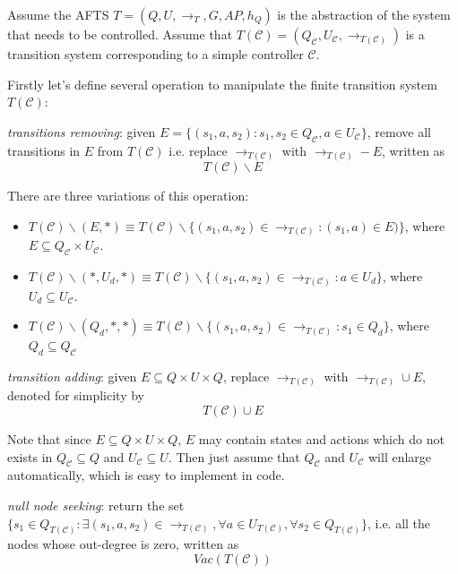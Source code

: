 Assume the AFTS $ T = (Q,U,\rightarrow_T, G, AP, h_Q) $ is the abstraction of the system that needs to be controlled. Assume that $ T(\mathcal{C})=(Q_{\mathcal{C}}, U_{\mathcal{C}},\rightarrow_{T(\mathcal{C})})$ is a transition system corresponding to a simple controller $ \mathcal{C} $. 

Firstly let's define several operation to manipulate the finite transition system $ T(\mathcal{C}) $:

\emph{transitions removing}: given $ E = \{(s_1,a,s_2): s_1,s_2\in Q_{\mathcal{C}}, a\in U_{\mathcal{C}}\} $, remove all transitions in $ E $ from $ T(\mathcal{C}) $ i.e. replace $ \rightarrow_{T(\mathcal{C})} $ with $\rightarrow_{T(\mathcal{C})} - E$, written as 
\begin{displaymath}
	T(\mathcal{C})\backslash E 
\end{displaymath}

There are three variations of this operation:
\begin{itemize}
	\item $ T(\mathcal{C}) \backslash (E,*) \equiv T(\mathcal{C})\backslash \{(s_1,a,s_2)\in \rightarrow_{T(\mathcal{C})}: (s_1,a)\in E)\}$, where $ E \subseteq Q_{\mathcal{C}}\times U_{\mathcal{C}} $.
	\item $ T(\mathcal{C}) \backslash (*,U_d,*) \equiv T(\mathcal{C})\backslash \{(s_1,a,s_2)\in \rightarrow_{T(\mathcal{C})}: a\in U_d \}$, where $ U_d\subseteq U_{\mathcal{C}} $.
	\item $ T(\mathcal{C}) \backslash (Q_d,*,*)\equiv T(\mathcal{C})\backslash \{ (s_1,a,s_2)\in \rightarrow_{T(\mathcal{C})}: s_1\in Q_d \}$, where $ Q_d \subseteq Q_{\mathcal{C}} $ 
\end{itemize}

\emph{transition adding}: given $ E \subseteq Q \times U \times Q$, replace $ \rightarrow_{T(\mathcal{C})} $ with $ \rightarrow_{T(\mathcal{C})}\cup E $, denoted for simplicity by
\begin{displaymath}
T(\mathcal{C})\cup E
\end{displaymath}

Note that since $ E \subseteq Q\times U\times Q $, $ E $ may contain states and actions which do not exists in $ Q_{\mathcal{C}}\subseteq Q $ and $ U_{\mathcal{C}}\subseteq U $. Then just assume that $ Q_{\mathcal{C}} $ and $ U_{\mathcal{C}} $ will enlarge automatically, which is easy to implement in code.

\emph{null node seeking}: return the set $\{s_1\in Q_{T(\mathcal{C})}: \exists (s_1,a,s_2)\in \rightarrow_{T(\mathcal{C})},\forall a\in U_{T(\mathcal{C})}, \forall s_2 \in Q_{T(\mathcal{C})}\} $, i.e. all the nodes whose out-degree is zero, written as
\begin{displaymath}
Vac(T(\mathcal{C}))
\end{displaymath}

